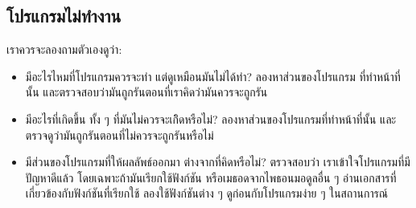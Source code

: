 \subsection{โปรแกรมไม่ทำงาน}


เราควรจะลองถามตัวเองดูว่า:

\begin{itemize}


\item มีอะไรไหมที่โปรแกรมควรจะทำ
แต่ดูเหมือนมันไม่ได้ทำ?
ลองหาส่วนของโปรแกรม
ที่ทำหน้าที่นั้น
และตรวจสอบว่ามันถูกรันตอนที่เราคิดว่ามันควรจะถูกรัน


\item มีอะไรที่เกิดขึ้น ทั้ง ๆ ที่มันไม่ควรจะเกิิดหรือไม่?
ลองหาส่วนของโปรแกรมที่ทำหน้าที่นั้น
และตรวจดูว่ามันถูกรันตอนที่ไม่ควรจะถูกรันหรือไม่


\item มีส่วนของโปรแกรมที่ให้ผลลัพธ์ออกมา ต่างจากที่คิดหรือไม่?
ตรวจสอบว่า
เราเข้าใจโปรแกรมที่มีปัญหาดีแล้ว
โดยเฉพาะถ้ามันเรียกใช้ฟังก์ชัน หรือเมธอดจากไพธอนมอดูลอื่น ๆ
อ่านเอกสารที่เกี่ยวข้องกับฟังก์ชันที่เรียกใช้
ลองใช้ฟังก์ชันต่าง ๆ ดูก่อนกับโปรแกรมง่าย ๆ ในสถานการณ์


\end{itemize}


